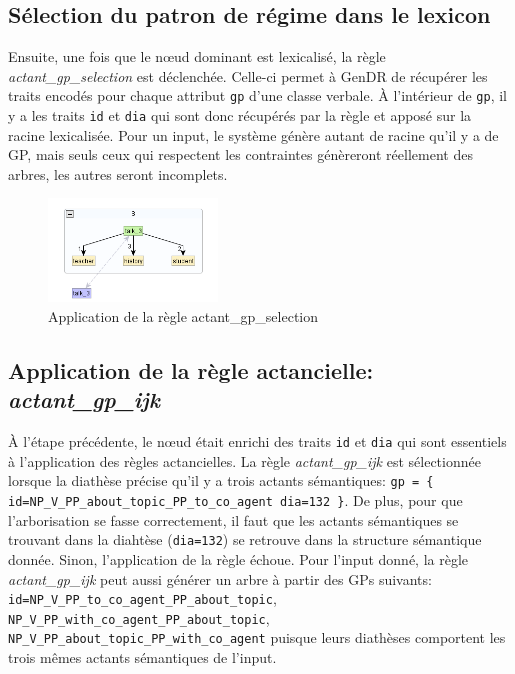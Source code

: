 \subsection{Sélection du patron de régime dans le lexicon}
Ensuite, une fois que le n\oe{}ud dominant est lexicalisé, la règle \emph{actant\_gp\_selection} est déclenchée. Celle-ci permet à GenDR de récupérer les traits encodés pour chaque attribut \texttt{gp} d'une classe verbale. À l'intérieur de \texttt{gp}, il y a les traits \texttt{id} et \texttt{dia} qui sont donc récupérés par la règle et apposé sur la racine lexicalisée. Pour un input, le système génère autant de racine qu'il y a de GP, mais seuls ceux qui respectent les contraintes génèreront réellement des arbres, les autres seront incomplets.

\begin{figure}[htb]
	\centering
	\includegraphics[width=0.4\textwidth, trim = {0cm 0cm 0cm 0cm},clip]{ch6/figs/selectiongp.png}
	\caption{Application de la règle actant\_gp\_selection}
	\label{deroulement1}
\end{figure}

\subsection{Application de la règle actancielle: \emph{actant\_gp\_ijk}}
À l'étape précédente, le n\oe{}ud  était enrichi des traits \texttt{id} et \texttt{dia} qui sont essentiels à l'application des règles actancielles. La règle \emph{actant\_gp\_ijk} est sélectionnée lorsque la diathèse précise qu'il y a trois actants sémantiques: \lstinline|gp = { id=NP_V_PP_about_topic_PP_to_co_agent dia=132 }|. De plus, pour que l'arborisation se fasse correctement, il faut que les actants sémantiques se trouvant dans la diahtèse (\texttt{dia=132}) se retrouve dans la structure sémantique donnée. Sinon, l'application de la règle échoue. Pour l'input donné, la règle \emph{actant\_gp\_ijk} peut aussi générer un arbre à partir des \acp{GP} suivants: \texttt{id=NP\_V\_PP\_to\_co\_agent\_PP\_about\_topic}, \texttt{NP\_V\_PP\_with\_co\_agent\_PP\_about\_topic}, \texttt{NP\_V\_PP\_about\_topic\_PP\_with\_co\_agent} puisque leurs diathèses comportent les trois mêmes actants sémantiques de l'input.

